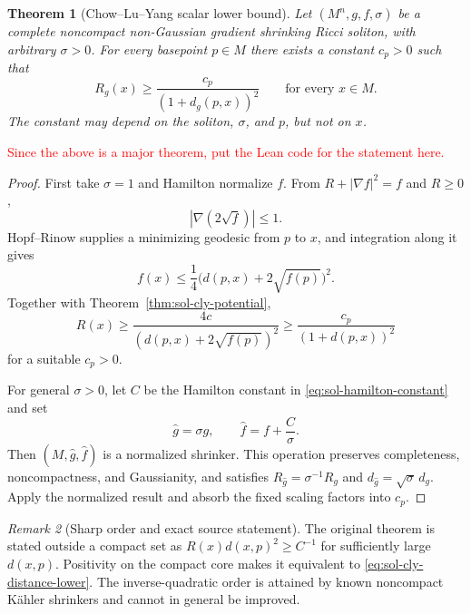 \documentclass[10pt]{coll-l}
\newtheorem{theorem}{Theorem}[chapter]
\theoremstyle{definition}
\theoremstyle{remark}
\newtheorem{remark}[theorem]{Remark}
\numberwithin{section}{chapter}
\numberwithin{equation}{chapter}
\begin{document}
\begin{theorem}[Chow--Lu--Yang scalar lower bound]
\label{thm:sol-cly-distance}
Let $(M^n,g,f,\sigma)$ be a complete noncompact non-Gaussian gradient
shrinking Ricci soliton, with arbitrary $\sigma>0$.  For every basepoint
$p\in M$ there exists a constant $c_p>0$ such that
\begin{equation}
             R_g(x)\geq
             \frac{c_p}{(1+d_g(p,x))^2}
             \qquad\text{for every }x\in M.              \label{eq:sol-cly-distance-lower}
\end{equation}
The constant may depend on the soliton, $\sigma$, and $p$, but not on $x$.
\end{theorem}

\textcolor{red}{Since the above is a major theorem, put the Lean code for the statement here.}

\begin{proof}
First take $\sigma=1$ and Hamilton normalize $f$.  From
$R+|\nabla f|^2=f$ and $R\geq0$,
\[
                    |\nabla(2\sqrt f)|\leq1.
\]
Hopf--Rinow supplies a minimizing geodesic from $p$ to $x$, and integration
along it gives
\[
             f(x)\leq\frac14
                 \bigl(d(p,x)+2\sqrt{f(p)}\bigr)^2.
\]
Together with Theorem~\ref{thm:sol-cly-potential},
\[
 R(x)\geq
 \frac{4c}{(d(p,x)+2\sqrt{f(p)})^2}
 \geq\frac{c_p}{(1+d(p,x))^2}
\]
for a suitable $c_p>0$.

For general $\sigma>0$, let $C$ be the Hamilton constant in
\eqref{eq:sol-hamilton-constant} and set
\[
              \widehat g=\sigma g,
              \qquad \widehat f=f+\frac C\sigma.
\]
Then $(M,\widehat g,\widehat f)$ is a normalized shrinker.  This operation
preserves completeness, noncompactness, and Gaussianity, and satisfies
$R_{\widehat g}=\sigma^{-1}R_g$ and
$d_{\widehat g}=\sqrt{\sigma}\,d_g$.  Apply the normalized result and absorb
the fixed scaling factors into $c_p$.
\end{proof}

\begin{remark}[Sharp order and exact source statement]
\label{rem:sol-cly-sharp}
The original theorem is stated outside a compact set as
$R(x)d(x,p)^2\geq C^{-1}$ for sufficiently large $d(x,p)$.  Positivity on
the compact core makes it equivalent to
\eqref{eq:sol-cly-distance-lower}.  The inverse-quadratic order is attained
by known noncompact K\"ahler shrinkers and cannot in general be improved.
\end{remark}
\end{document}
